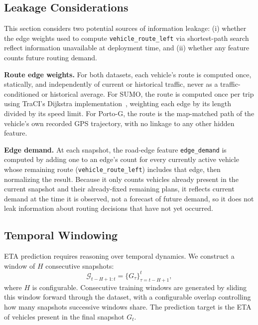 \subsection{Leakage Considerations}\label{sec:leakage}
This section considers two potential sources of information leakage: (i) whether the edge weights used to compute \texttt{vehicle\_route\_left} via shortest-path search reflect information unavailable at deployment time, and (ii) whether any feature counts future routing demand.

\textbf{Route edge weights.} For both datasets, each vehicle's route is computed once, statically, and independently of current or historical traffic, never as a traffic-conditioned or historical average. For SUMO, the route is computed once per trip using TraCI's Dijkstra implementation~\cite{SUMO2018,dijkstra1959}, weighting each edge by its length divided by its speed limit. For Porto-G, the route is the map-matched path of the vehicle's own recorded GPS trajectory, with no linkage to any other hidden feature.

\textbf{Edge demand.} At each snapshot, the road-edge feature \texttt{edge\_demand} is computed by adding one to an edge's count for every currently active vehicle whose remaining route (\texttt{vehicle\_route\_left}) includes that edge, then normalizing the result. Because it only counts vehicles already present in the current snapshot and their already-fixed remaining plans, it reflects current demand at the time it is observed, not a forecast of future demand, so it does not leak information about routing decisions that have not yet occurred.

\subsection{Temporal Windowing}
ETA prediction requires reasoning over temporal dynamics. We construct a window of $H$ consecutive snapshots:
\begin{equation}
\mathcal{G}_{t-H+1:t} = \{G_\tau\}_{\tau=t-H+1}^t,
\end{equation}
where $H$ is configurable. Consecutive training windows are generated by sliding this window forward through the dataset, with a configurable overlap controlling how many snapshots successive windows share. The prediction target is the ETA of vehicles present in the final snapshot $G_t$.

